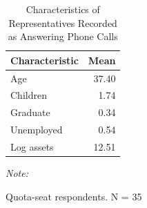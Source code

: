 \begin{table}
\centering
\caption{\label{tab:phone_reply_char}Characteristics of Representatives Recorded as Answering Phone Calls}
\centering
\fontsize{8}{10}\selectfont
\begin{threeparttable}
\begin{tabular}[t]{lr}
\toprule
Characteristic & Mean\\
\midrule
Age & 37.40\\
Children & 1.74\\
Graduate & 0.34\\
Unemployed & 0.54\\
Log assets & 12.51\\
\bottomrule
\end{tabular}
\begin{tablenotes}
\item \textit{Note: } 
\item Quota-seat respondents. N = 35
\end{tablenotes}
\end{threeparttable}
\end{table}
